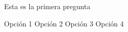 
\question Esta es la primera pregunta

  \begin{oneparchoices}
    \choice Opción 1
    \choice Opción 2
    \choice Opción 3
    \choice Opción 4
  \end{oneparchoices}
  \answerline[A]
